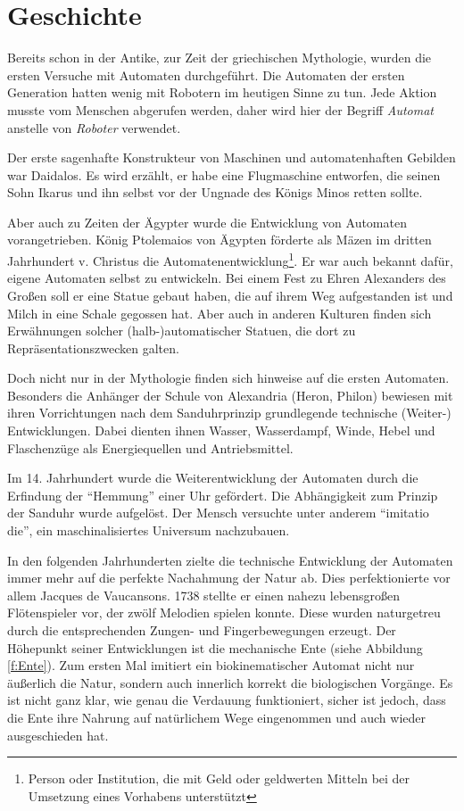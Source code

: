 \section{Geschichte}
Bereits schon in der Antike, zur Zeit der griechischen Mythologie, wurden die ersten Versuche mit Automaten durchgeführt. Die Automaten der ersten Generation hatten wenig mit Robotern im heutigen Sinne zu tun. Jede Aktion musste vom Menschen abgerufen werden, daher wird hier der Begriff \textit{Automat} anstelle von \textit{Roboter} verwendet.

Der erste sagenhafte Konstrukteur von Maschinen und automatenhaften Gebilden war Daidalos. Es wird erzählt, er habe eine Flugmaschine entworfen, die seinen Sohn Ikarus und ihn selbst vor der Ungnade des Königs Minos retten sollte. 

Aber auch zu Zeiten der Ägypter wurde die Entwicklung von Automaten vorangetrieben. König Ptolemaios von Ägypten förderte als Mäzen im dritten Jahrhundert v. Christus die Automatenentwicklung\footnote{Person oder Institution, die mit Geld oder geldwerten Mitteln bei der Umsetzung eines Vorhabens unterstützt}. Er war auch bekannt dafür, eigene Automaten selbst zu entwickeln. Bei einem Fest zu Ehren Alexanders des Großen soll er eine Statue gebaut haben, die auf ihrem Weg aufgestanden ist und Milch in eine Schale gegossen hat. Aber auch in anderen Kulturen finden sich Erwähnungen solcher (halb-)automatischer Statuen, die dort zu Repräsentationszwecken galten.

Doch nicht nur in der Mythologie finden sich hinweise auf die ersten Automaten. Besonders die Anhänger der Schule von Alexandria (Heron, Philon) bewiesen mit ihren Vorrichtungen nach dem Sanduhrprinzip grundlegende technische (Weiter-) Entwicklungen. Dabei dienten ihnen Wasser, Wasserdampf, Winde, Hebel und Flaschenzüge als Energiequellen und Antriebsmittel.

Im 14. Jahrhundert wurde die Weiterentwicklung der Automaten durch die Erfindung der "`Hemmung"' einer Uhr gefördert. Die Abhängigkeit zum Prinzip der Sanduhr wurde aufgelöst. Der Mensch versuchte unter anderem "`imitatio die"', ein maschinalisiertes Universum nachzubauen. 

In den folgenden Jahrhunderten zielte die technische Entwicklung der Automaten immer mehr auf die perfekte Nachahmung der Natur  ab. Dies perfektionierte vor allem Jacques de Vaucansons. 1738 stellte er einen nahezu lebensgroßen Flötenspieler vor, der zwölf Melodien spielen konnte. Diese wurden naturgetreu durch die entsprechenden Zungen- und Fingerbewegungen erzeugt. Der Höhepunkt seiner Entwicklungen ist die mechanische Ente (siehe Abbildung \ref{f:Ente}). Zum ersten Mal imitiert ein biokinematischer Automat nicht nur äußerlich die Natur, sondern auch innerlich korrekt die biologischen Vorgänge. Es ist nicht ganz klar, wie genau die Verdauung funktioniert, sicher ist jedoch, dass die Ente ihre Nahrung auf natürlichem Wege eingenommen und auch wieder ausgeschieden hat.  

